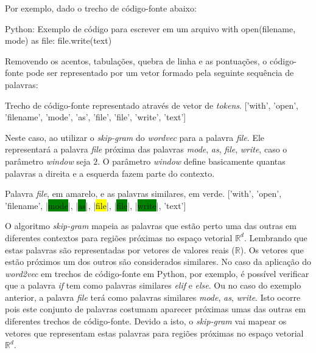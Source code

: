 Por exemplo, dado o trecho de código-fonte abaixo:

\begin{mypython}{Python: Exemplo de código para escrever em um arquivo}
with open(filename, mode) as file:
    file.write(text)
\end{mypython}

Removendo os acentos, tabulações, quebra de linha e as pontuações, o código-fonte pode ser representado por um vetor formado pela seguinte sequência de palavras:

\begin{mypythonembedding}{Trecho de código-fonte representado através de vetor de \textit{tokens}.}
  ['with', 'open', 'filename', 'mode', 'as', 'file', 'file', 'write', 'text']
\end{mypythonembedding}

Neste caso, ao utilizar o \textit{skip-gram} do \textit{wordvec} para a palavra \emph{file}. Ele representará a palavra \emph{file} próxima das palavras \emph{mode}, \emph{as}, \emph{file}, \emph{write}, caso o parâmetro \textit{window} seja $2$. O parâmetro \textit{window} define basicamente quantas palavras a direita e a esquerda fazem parte do contexto.

\begin{mypythonembedding}{Palavra \textit{file}, em amarelo, e as palavras similares, em verde.}
  ['with', 'open', 'filename', |\colorbox{green}{mode}|, |\colorbox{green}{as}|, |\colorbox{yellow}{file}|, |\colorbox{green}{file}|, |\colorbox{green}{write}|, 'text']
\end{mypythonembedding}

O algoritmo \textit{skip-gram} mapeia as palavras que estão perto uma das outras em diferentes contextos para regiões próximas no espaço vetorial $\mathbb{R}^{d}$. Lembrando que estas palavras são representadas por vetores de valores reais ($\mathbb{R}$). Os vetores que estão próximos um dos outros são considerados similares. No caso da aplicação do \textit{word2vec} em trechos de código-fonte em Python, por exemplo, é possível verificar que a palavra \emph{if} tem como palavras similares \emph{elif} e \emph{else}. Ou no caso do exemplo anterior, a palavra \emph{file} terá como palavras similares \emph{mode}, \emph{as}, \emph{write}. Isto ocorre pois este conjunto de palavras costumam aparecer próximas umas das outras em diferentes trechos de código-fonte. Devido a isto, o \textit{skip-gram} vai mapear os vetores que representam estas palavras para regiões próximas no espaço vetorial $\mathbb{R}^{d}$.



